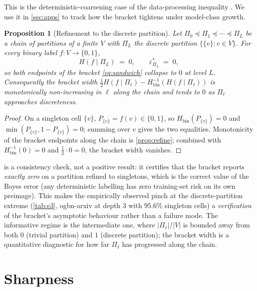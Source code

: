 \documentclass[10pt]{article}
\newtheorem{proposition}[theorem]{Proposition}
\theoremstyle{definition}
\theoremstyle{remark}
\newcommand{\Hbin}{H_{\mathrm{bin}}}
\newcommand{\Hinv}{H_{\mathrm{bin}}^{-1}}
\newcommand{\eps}{\varepsilon}
\begin{document}
This is the deterministic-coarsening case of the data-processing
inequality \citep[Thm.\ 2.8.1]{cover2006eit}. We use it in
\cref{sec:apps} to track how the bracket tightens under
model-class growth.

\begin{proposition}[Refinement to the discrete partition]\label{prop:refine-discrete}
Let $\Pi_{0} \preceq \Pi_{1} \preceq \cdots \preceq \Pi_{L}$ be
a chain of partitions of a finite $V$ with $\Pi_{L}$ the
\emph{discrete} partition $\{\{v\} : v \in V\}$. For every
binary label $f : V \to \{0, 1\}$,
\[
  H(f \mid \Pi_{L}) \;=\; 0,
  \qquad
  \eps^{\!*}_{\Pi_{L}} \;=\; 0,
\]
so both endpoints of the bracket \eqref{eq:sandwich} collapse
to $0$ at level $L$. Consequently the bracket width
$\tfrac{1}{2} H(f \mid \Pi_{\ell}) - \Hinv(H(f \mid \Pi_{\ell}))$
is monotonically non-increasing in $\ell$ along the chain and
tends to $0$ as $\Pi_{\ell}$ approaches discreteness.
\end{proposition}

\begin{proof}
On a singleton cell $\{v\}$, $P_{\{v\}} = f(v) \in \{0, 1\}$,
so $\Hbin(P_{\{v\}}) = 0$ and $\min(P_{\{v\}}, 1 - P_{\{v\}}) = 0$;
summing over $v$ gives the two equalities. Monotonicity of the
bracket endpoints along the chain is \cref{prop:refine};
combined with $\Hinv(0) = 0$ and $\tfrac{1}{2} \cdot 0 = 0$,
the bracket width vanishes.
\end{proof}

 is a consistency check, not a
positive result: it certifies that the bracket reports
\emph{exactly zero} on a partition refined to singletons,
which is the correct value of the Bayes error (any deterministic
labelling has zero training-set risk on its own preimage). This
makes the empirically observed pinch at the discrete-partition
extreme (\cref{tab:e3}, ogbn-arxiv at depth $3$ with $95.6\%$
singleton cells) a \emph{verification} of the bracket's
asymptotic behaviour rather than a failure mode. The
informative regime is the intermediate one, where
$|\Pi_{\ell}| / |V|$ is bounded away from both $0$ (trivial
partition) and $1$ (discrete partition); the bracket width is a
quantitative diagnostic for how far $\Pi_{\ell}$ has progressed
along the chain.

\section{Sharpness}\label{sec:sharp}
\end{document}
